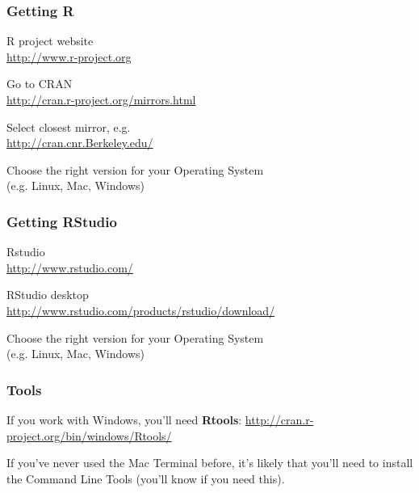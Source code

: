 \documentclass[12pt]{beamer}\usepackage[]{graphicx}\usepackage[]{color}
\begin{document}

\begin{frame}
\frametitle{Getting R}

\bi
 \item R project website \\
 \url{http://www.r-project.org}
 \item Go to CRAN \\
 \url{http://cran.r-project.org/mirrors.html}
 \item Select closest mirror, e.g. \\
 \url{http://cran.cnr.Berkeley.edu/}
 \item Choose the right version for your Operating System \\
 {\lolit (e.g. Linux, Mac, Windows)}
\ei
\eb

\end{frame}


\begin{frame}
\frametitle{Getting RStudio}

\bi
 \item Rstudio \\
 \url{http://www.rstudio.com/}
 \item RStudio desktop \\
 \small{\url{http://www.rstudio.com/products/rstudio/download/}}
 \item Choose the right version for your Operating System \\
 {\lolit (e.g. Linux, Mac, Windows)}
\ei
\eb

\end{frame}


\begin{frame}
\frametitle{Tools}

If you work with Windows, you'll need \textbf{Rtools}:
 {\scriptsize \url{http://cran.r-project.org/bin/windows/Rtools/}}
\eb

If you've never used the Mac Terminal before, it's likely that you'll need to install the {\lit Command Line Tools} (you'll know if you need this).
\eb

\end{frame}

\end{document}
